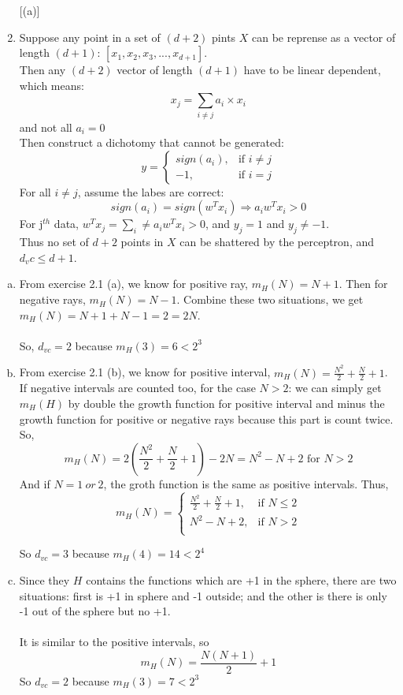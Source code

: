 \documentclass[11pt]{article}
\begin{document}
\begin{enumerate} [(a)]
	\item Suppose any point in a set of $(d+2)$ pints $X$ can be reprense as a vector of length $(d+1)$: $[x_1,x_2,x_3,...,x_{d+1}]$.\\
	Then any $(d+2)$ vector of length $(d+1)$ have to be linear dependent, which means: \[x_j=\sum_{i\neq j}a_i\times x_i\] and not all $a_i=0$\\
	Then construct a dichotomy that cannot be generated:\\\[
		y = \begin{cases}
		sign(a_i),& \text{if } i\neq j\\
		-1,& \text{if } i=j
		\end{cases}
	\]
	For all $i\neq j$, assume the labes are correct:\[
	sign(a_i)=sign(w^Tx_i)\Rightarrow a_iw^Tx_i>0
	\]
	For j$^{th}$ data, $w^Tx_j=\sum_i\neq a_iw^Tx_i>0$, and $y_j=1$ and $y_j\neq -1$.\\
	Thus no set of $d+2$ points in $X$ can be shattered by the perceptron, and $d_vc\leq d+1$.
\end{enumerate}
\newpage
{}
\begin{enumerate} [(a)]
	\item From exercise 2.1 (a), we know for positive ray, $m_H(N)=N+1$. Then for negative rays, $m_H(N)=N-1$. Combine these two situations, we get $m_H(N)=N+1+N-1=2=2N$.\\\\
	So, $d_{vc}=2$ because $m_H(3)=6<2^3$

	\item From exercise 2.1 (b), we know for positive interval, $m_H(N)=\frac{N^2}{2}+\frac{N}{2}+1$. If negative intervals are counted too, for the case $N > 2$: we can simply get $m_H(H)$ by double the growth function for positive interval and minus the growth function for positive or negative rays because this part is count twice.\\
	So,\[
		m_H(N)=2(\frac{N^2}{2}+\frac{N}{2}+1)-2N=N^2-N+2\text{ for }N>2
	\]
	And if $N=1\ or\ 2$, the groth function is the same as positive intervals.
	Thus, \[
		m_H(N) = \begin{cases}
		\frac{N^2}{2}+\frac{N}{2}+1,& \text{if } N\leq2\\
		N^2-N+2,& \text{if } N>2\\
		\end{cases}
	\]


	So $d_{vc}=3$ because $m_H(4)=14<2^4$

	\item Since they $H$ contains the functions which are +1 in the sphere, there are two situations: first is +1 in sphere and -1 outside; and the other is there is only -1 out of the sphere but no +1.\\
	\\It is similar to the positive intervals, so\[
		m_H(N)=\frac{N(N+1)}{2}+1
	\]
	So $d_{vc}=2$ because $m_H(3)=7<2^3$
\end{enumerate}
\end{document}

